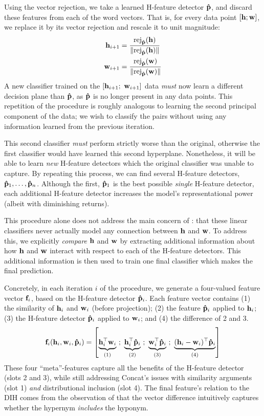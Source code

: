 Using the vector rejection, we take a learned H-feature detector ${\mathbf{\hat p}}$,
and discard these features from each of the word vectors. That is, for every data
point $[{\mathbf{h}}; {\mathbf{w}}]$, we replace it by its vector rejection and rescale
it to unit magnitude:
\begin{align*}
  {\mathbf{h}}_{i+1} & = \frac{\text{rej}_{{\mathbf{\hat p}}}({\mathbf{h}})}{\|\text{rej}_{{\mathbf{\hat p}}}({\mathbf{h}})\|}\\
  {\mathbf{w}}_{i+1} & = \frac{\text{rej}_{{\mathbf{\hat p}}}({\mathbf{w}})}{\|\text{rej}_{{\mathbf{\hat p}}}({\mathbf{w}})\|}
\end{align*}
A new classifier trained on the $[{\mathbf{h}}_{i+1};~{\mathbf{w}}_{i+1}]$ data {\em must} now
learn a different decision plane than ${\mathbf{\hat p}}$, as ${\mathbf{\hat p}}$ is no longer
present in any data points. This repetition of the procedure is roughly
analogous to learning the second principal component of the data; we wish to
classify the pairs without using any information learned from the previous
iteration.

This second classifier {\em must} perform strictly worse than the original,
otherwise the first classifier would have learned this second hyperplane.
Nonetheless, it will be able to learn {\em new} H-feature detectors
which the original classifier was unable to capture. By repeating this process,
we can find several H-feature detectors, ${\mathbf{\hat p}}_1, \ldots, {\mathbf{\hat p}}_n$. Although
the first, ${\mathbf{\hat p}}_1$ is the best possible {\em single} H-feature detector,
each additional H-feature detector increases the model's representational power
(albeit with diminishing returns).

This procedure alone does not address the main concern of
: that these linear classifiers never actually model
any connection between ${\mathbf{h}}$ and ${\mathbf{w}}$.  To address this, we explicitly {\em
compare} ${\mathbf{h}}$ and ${\mathbf{w}}$ by extracting additional information about how ${\mathbf{h}}$
and ${\mathbf{w}}$ interact with respect to each of the H-feature detectors. This
additional information is then used to train one final classifier which makes
the final prediction.

Concretely, in each iteration $i$ of the procedure, we generate a four-valued
feature vector
${\mathbf{f}}_i$, based on the H-feature detector ${\mathbf{\hat p}}_i$. Each
feature vector contains (1) the similarity of ${\mathbf{h}}_i$ and ${\mathbf{w}}_i$ (before projection);
(2) the feature
${\mathbf{\hat p}}_i$ applied to ${\mathbf{h}}_i$; (3) the H-feature detector ${\mathbf{\hat p}}_i$ applied to ${\mathbf{w}}_i$; and
(4) the difference of 2 and 3.
\begin{align*}
  {\mathbf{f}}_i({\mathbf{h}}_i, {\mathbf{w}}_i, {\mathbf{\hat p}}_i) = \left[ \underbrace{{\mathbf{h}}_i^{\top}{\mathbf{w}}_i}_{(1)}~;~\underbrace{{\mathbf{h}}_i^{\top}{\mathbf{\hat p}}_i}_{(2)}~;~\underbrace{{\mathbf{w}}_i^{\top}{\mathbf{\hat p}}_i}_{(3)}~;~\underbrace{({\mathbf{h}}_i - {\mathbf{w}}_i)^{\top}{\mathbf{\hat p}}_i}_{(4)} \right]
\end{align*}
These four ``meta''-features capture all the benefits of the
H-feature detector (slots 2 and 3), while still addressing Concat's issues with
similarity arguments (slot 1) {\em and} distributional inclusion (slot 4).
The final feature's relation to the DIH comes from the observation of
 that the vector difference intuitively captures
whether the hypernym {\em includes} the hyponym.

